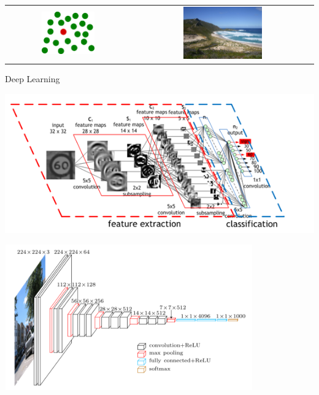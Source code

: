 \documentclass[10pt]{beamer}
\begin{document}
\begin{frame}{}
    \begin{center}
        \begin{tabular} {cc}
        \includegraphics[width=0.45\textwidth]{./img/red_in_green.png} &
        \includegraphics[width=0.45\textwidth]{./img/cliff.jpg}
        \end{tabular}
    \end{center}
\end{frame}

\begin{frame}{Deep Learning}
    \begin{center}
        \includegraphics[width=1.0\textwidth]{./img/convnet.png}
    \end{center}
\end{frame}

\begin{frame}{}
    \begin{center}
        \includegraphics[width=0.8\textwidth]{./img/vgg16.png}
    \end{center}
\end{frame}
\end{document}
